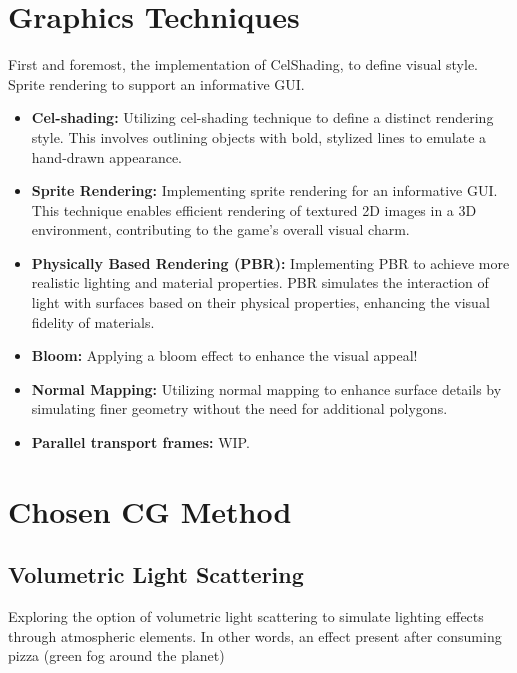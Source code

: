 \documentclass[a4paper,12pt]{article}
\begin{document}
\pagebreak

\section{Graphics Techniques}
First and foremost, the implementation of CelShading, to define visual style.
Sprite rendering to support an informative GUI.
\begin{itemize}
    \item \textbf{Cel-shading:} Utilizing cel-shading technique to define a distinct rendering style. This involves outlining objects with bold, stylized lines to emulate a hand-drawn appearance.
  
    \item \textbf{Sprite Rendering:} Implementing sprite rendering for an informative GUI. This technique enables efficient rendering of textured 2D images in a 3D environment, contributing to the game's overall visual charm.
    
    \item \textbf{Physically Based Rendering (PBR):} Implementing PBR to achieve more realistic lighting and material properties. PBR simulates the interaction of light with surfaces based on their physical properties, enhancing the visual fidelity of materials.

    \item \textbf{Bloom:} Applying a bloom effect to enhance the visual appeal!
  
    \item \textbf{Normal Mapping:} Utilizing normal mapping to enhance surface details by simulating finer geometry without the need for additional polygons.

    \item \textbf{Parallel transport frames:} WIP.

\end{itemize}

\section{Chosen CG Method}
\subsection*{Volumetric Light Scattering}
Exploring the option of volumetric light scattering to simulate lighting effects through atmospheric elements. In other words, an effect present after consuming pizza (green fog around the planet)
\end{document}
